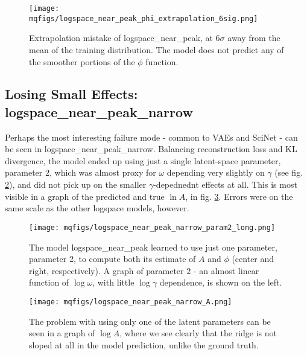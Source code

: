 \documentclass[aps,prl,preprint,groupedaddress]{revtex4-1}
\begin{document}
\begin{figure}[h]
   \centering
   \texttt{[image: mqfigs/logspace\_near\_peak\_phi\_extrapolation\_6sig.png]}
   \caption{\label{logspaceNearPeakPhi} Extrapolation mistake of logspace\_near\_peak, at $6\sigma$ away from the mean of the training distribution. The model does not predict any of the smoother portions of the $\phi$ function.}
\end{figure}

\subsection{ Losing Small Effects: logspace\_near\_peak\_narrow}

Perhaps the most interesting failure mode - common to VAEs and SciNet - can be seen in logspace\_near\_peak\_narrow. Balancing reconstruction loss and KL divergence, the model ended up using just a single latent-space parameter, parameter $2$, which was almost proxy for $\omega$ depending very slightly on $\gamma$ (see fig. \ref{logspaceNearPeakNarrowParam2}), and did not pick up on the smaller $\gamma$-depednednt effects at all. This is most visible in a graph of the predicted and true $\ln A$, in fig. \ref{logspaceNearPeakNarrowA}. Errors were on the same scale as the other logspace models, however.

\begin{figure}[h]
   \centering
   \texttt{[image: mqfigs/logspace\_near\_peak\_narrow\_param2\_long.png]}
   \caption{\label{logspaceNearPeakNarrowParam2} The model logspace\_near\_peak learned to use just one parameter, parameter 2, to compute both its estimate of $A$ and $\phi$ (center and right, respectively). A graph of parameter $2$ - an almost linear function of $\log \omega$, with little $\log \gamma$ dependence, is shown on the left.}
\end{figure}

\begin{figure}[h]
   \centering
   \texttt{[image: mqfigs/logspace\_near\_peak\_narrow\_A.png]}
   \caption{\label{logspaceNearPeakNarrowA} The problem with using only one of the latent parameters can be seen in a graph of $\log A$, where we see clearly that the ridge is not sloped at all in the model prediction, unlike the ground truth.}
\end{figure}
\end{document}
